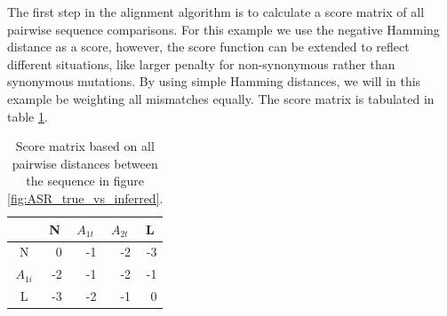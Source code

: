 The first step in the alignment algorithm is to calculate a score matrix of all pairwise sequence comparisons.
For this example we use the negative Hamming distance as a score, however, the score function can be extended to reflect different situations, like larger penalty for non-synonymous rather than synonymous mutations.
By using simple Hamming distances, we will in this example be weighting all mismatches equally.
The score matrix is tabulated in table \ref{distance_matrix}.

\begin{table}[ht!]
\centering
\begin{tabular}{c|r|r|r|r}
\rowcolor[HTML]{EFEFEF}
                                 & \multicolumn{1}{c|}{\cellcolor[HTML]{EFEFEF}N} & \multicolumn{1}{c|}{\cellcolor[HTML]{EFEFEF}$A_{1t}$} & \multicolumn{1}{c|}{\cellcolor[HTML]{EFEFEF}$A_{2t}$} & \multicolumn{1}{c}{\cellcolor[HTML]{EFEFEF}L} \\ \hline
\cellcolor[HTML]{EFEFEF}N        & 0                                              & -1                                                    & -2                                                    & \multicolumn{1}{r|}{-3}                       \\ \hline
\cellcolor[HTML]{EFEFEF}$A_{1i}$ & -2                                             & -1                                                     & -2                                                    & \multicolumn{1}{r|}{-1}                       \\ \hline
\cellcolor[HTML]{EFEFEF}L        & -3                                             & -2                                                    & -1                                                    & \multicolumn{1}{r|}{0}                        \\ \hline
\end{tabular}
    \caption{
         \label{distance_matrix}
             Score matrix based on all pairwise distances between the sequence in figure \ref{fig:ASR_true_vs_inferred}.
             }
\end{table}

